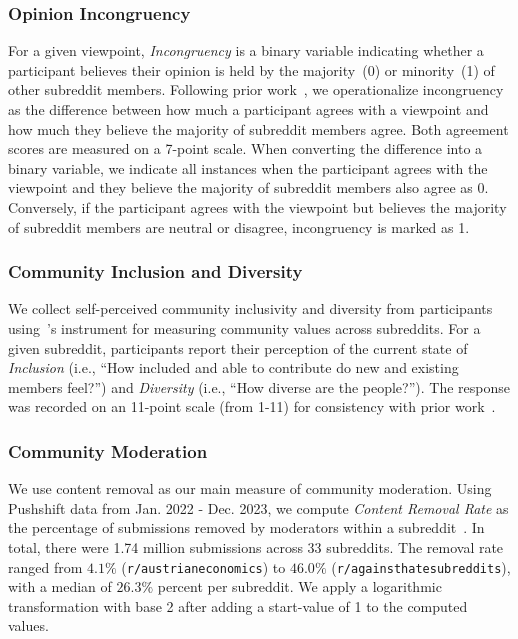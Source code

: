 \subsubsection{Opinion Incongruency}
For a given viewpoint, \textit{Incongruency} is a binary variable indicating whether a participant believes their opinion is held by the majority~(0) or minority~(1) of other subreddit members. Following prior work~\cite{neuwirth2007spiral,chia2014authoritarian}, we operationalize incongruency as the difference between how much a participant agrees with a viewpoint and how much they believe the majority of subreddit members agree. Both agreement scores are measured on a 7-point scale. When converting the difference into a binary variable, we indicate all instances when the participant agrees with the viewpoint and they believe the majority of subreddit members also agree as 0. Conversely, if the participant agrees with the viewpoint but believes the majority of subreddit members are neutral or disagree, incongruency is marked as 1. 

\subsubsection{Community Inclusion and Diversity}
We collect self-perceived community inclusivity and diversity from participants using~\citet{weld2022makes}'s instrument for measuring community values across subreddits. For a given subreddit, participants report their perception of the current state of \textit{Inclusion} (i.e., ``How included and able to contribute do new and existing members feel?'') and \textit{Diversity} (i.e., ``How diverse are the people?''). The response was recorded on an 11-point scale (from 1-11) for consistency with prior work~\cite{weld2022makes}. 

\subsubsection{Community Moderation}
We use content removal as our main measure of community moderation. Using Pushshift data from Jan. 2022 - Dec. 2023, we compute \textit{Content Removal Rate} as the percentage of submissions removed by moderators within a subreddit~\cite{jhaver2019does}. In total, there were 1.74 million submissions across 33 subreddits. The removal rate ranged from $4.1\%$ (\texttt{r/austrianeconomics}) to $46.0\%$ (\texttt{r/againsthatesubreddits}), with a median of $26.3\%$ percent per subreddit. We apply a logarithmic transformation with base 2 after adding a start-value of 1 to the computed values.

